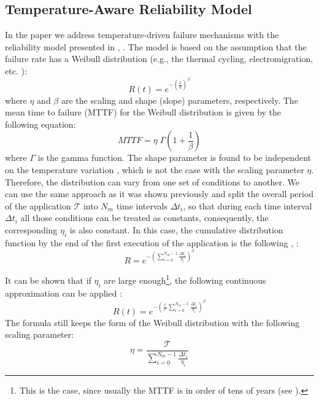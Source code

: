 \subsection{Temperature-Aware Reliability Model} \label{sec:reliability-model}
In the paper we address temperature-driven failure mechanisms with the reliability model presented in \cite{huang2009}, \cite{xiang2010}. The model is based on the assumption that the failure rate has a Weibull distribution (e.g., the thermal cycling, electromigration, etc. \cite{jedec2010}):
\[
  R(t) = e^{-(\frac{t}{\eta})^\beta}
\]
where $\eta$ and $\beta$ are the scaling and shape (slope) parameters, respectively. The mean time to failure (MTTF) for the Weibull distribution is given by the following equation:
\begin{equation} \label{eq:general-mttf}
  MTTF = \eta \; \Gamma(1 + \frac{1}{\beta})
\end{equation}
where $\Gamma$ is the gamma function. The shape parameter is found to be independent on the temperature variation \cite{chang2006}, which is not the case with the scaling parameter $\eta$. Therefore, the distribution can vary from one set of conditions to another. We can use the same approach as it was shown previously and split the overall period of the application $\mathcal{T}$ into $N_m$ time intervals $\Delta t_i$, so that during each time interval $\Delta t_i$ all those conditions can be treated as constants, consequently, the corresponding $\eta_i$ is also constant. In this case, the cumulative distribution function by the end of the first execution of the application is the following \cite{huang2009}, \cite{xiang2010}:
\[
  R = e^{-(\sum_{i=0}^{N_m - 1} \frac{\Delta t_i}{\eta_i})^\beta}
\]

It can be shown that if $\eta_i$ are large enough\footnote{This is the case, since usually the MTTF is in order of tens of years (see ).}, the following continuous approximation can be applied \cite{xiang2010}:
\[
  R(t) = e^{-(\frac{t}{\mathcal{T}} \sum_{i=0}^{N_m - 1} \frac{\Delta t_i}{\eta_i})^\beta}
\]
The formula still keeps the form of the Weibull distribution with the following scaling parameter:
\[
  \eta = \frac{\mathcal{T}}{\sum_{i=0}^{N_m - 1} \frac{\Delta t_i}{\eta_i}}
\]

